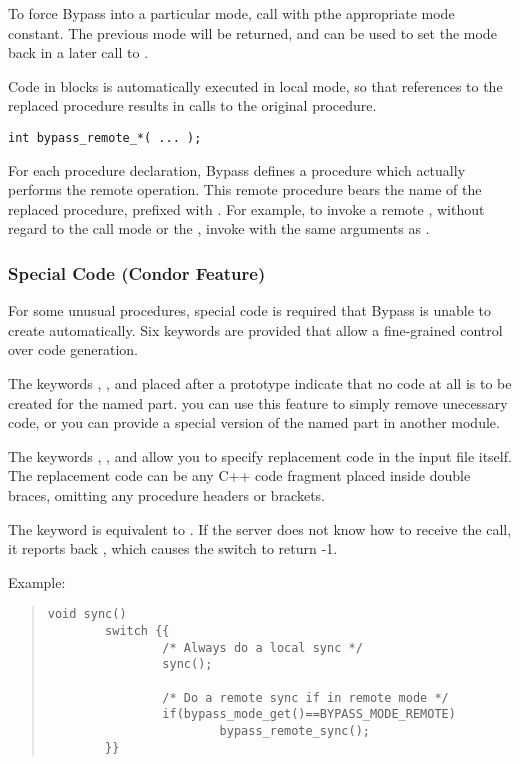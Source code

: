 To force Bypass into a particular mode, call  with
pthe appropriate mode constant.  The previous mode will be returned, and
can be used to set the mode back in a later call to .

Code in  blocks is automatically executed in local
mode, so that references to the replaced procedure results in calls to the
original procedure.

\begin{verbatim}
int bypass_remote_*( ... );
\end{verbatim}

For each procedure declaration, Bypass defines a procedure which actually
performs the remote operation.  This remote procedure bears the name of
the replaced procedure, prefixed with .  For example, to
invoke a remote , without regard to the call mode or
the , invoke  with the
same arguments as .

\subsubsection{Special Code (Condor Feature)}

For some unusual procedures, special code is required that Bypass is unable to create automatically.  Six keywords are provided that allow a fine-grained control over code generation.

The keywords , , and  placed after a prototype indicate that no code at all is to be created for the named part.  you can use this feature to simply remove unecessary code, or you can provide a special version of the named part in another module.

The keywords , , and  allow you to specify replacement code in the input file itself.  The replacement code can be any C++ code fragment placed inside double braces, omitting any procedure headers or brackets.

The keyword  is equivalent to .
If the server does not know how to receive the call, it reports back , which causes the switch to return -1.

Example:

\begin{quote}
\begin{verbatim}
void sync()
        switch {{
                /* Always do a local sync */
                sync();

                /* Do a remote sync if in remote mode */
                if(bypass_mode_get()==BYPASS_MODE_REMOTE)
                        bypass_remote_sync();
        }}
\end{verbatim}
\end{quote}
 
